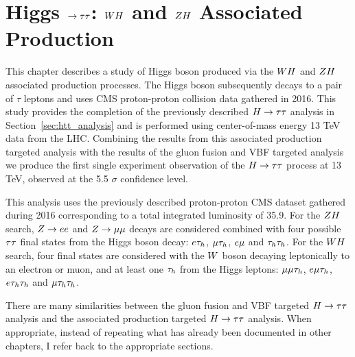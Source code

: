 \chapter{Higgs $\to \tau\tau$: $WH$ and $ZH$ Associated Production}
\label{sec:vh_analysis}

This chapter describes a study of Higgs boson produced via the $WH$ and
$ZH$ associated production processes. The Higgs boson subsequently
decays to a pair of $\tau$ leptons and uses CMS proton-proton collision data gathered in 2016. 
This study provides the completion of the previously described
$H\to\tau\tau$ analysis in Section~\ref{sec:htt_analysis} and is performed 
using center-of-mass energy 13 TeV data from the LHC. Combining
the results from this associated production targeted analysis with the results 
of the gluon fusion and VBF targeted analysis
we produce the first single experiment observation of the $H\to\tau\tau$ process at 13 TeV, 
observed at the 5.5 $\sigma$ confidence level. 

This analysis uses the previously described proton-proton CMS dataset gathered during 2016 
corresponding to a total integrated luminosity of 35.9\fbinv.
For the $ZH$ search, $Z\rightarrow ee$
and $Z \to \mu\mu$ decays are considered combined with four possible $\tau\tau$ 
final states from the Higgs boson decay: $e\tau_{h}$, $\mu\tau_{h}$,
$e\mu$ and $\tau_{h}\tau_{h}$. For the $WH$ search, four final states are considered with
the $W$ boson decaying leptonically to an electron or muon, and at least one $\tau_{h}$ from the Higgs leptons:
$\mu\mu\tau_{h}$, $e\mu\tau_{h}$, $e\tau_{h}\tau_{h}$ and $\mu\tau_{h}\tau_{h}$. 

There are many similarities between the gluon fusion and VBF targeted $H\to\tau\tau$ analysis
and the associated production targeted $H\to\tau\tau$ analysis. When appropriate, instead of repeating
what has already been documented in other chapters, I refer back to the appropriate sections.



